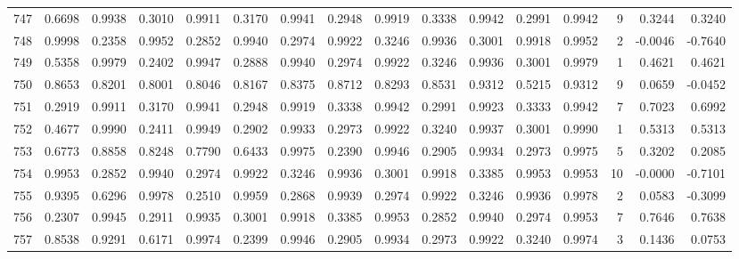 \begin{tabular}{lrrrrrrrrrrrrrrr}
747 &      0.6698 &  0.9938 &  0.3010 &  0.9911 &  0.3170 &  0.9941 &  0.2948 &  0.9919 &  0.3338 &  0.9942 &   0.2991 &     0.9942 &      9 &                    0.3244 &                     0.3240 \\
748 &      0.9998 &  0.2358 &  0.9952 &  0.2852 &  0.9940 &  0.2974 &  0.9922 &  0.3246 &  0.9936 &  0.3001 &   0.9918 &     0.9952 &      2 &                   -0.0046 &                    -0.7640 \\
749 &      0.5358 &  0.9979 &  0.2402 &  0.9947 &  0.2888 &  0.9940 &  0.2974 &  0.9922 &  0.3246 &  0.9936 &   0.3001 &     0.9979 &      1 &                    0.4621 &                     0.4621 \\
750 &      0.8653 &  0.8201 &  0.8001 &  0.8046 &  0.8167 &  0.8375 &  0.8712 &  0.8293 &  0.8531 &  0.9312 &   0.5215 &     0.9312 &      9 &                    0.0659 &                    -0.0452 \\
751 &      0.2919 &  0.9911 &  0.3170 &  0.9941 &  0.2948 &  0.9919 &  0.3338 &  0.9942 &  0.2991 &  0.9923 &   0.3333 &     0.9942 &      7 &                    0.7023 &                     0.6992 \\
752 &      0.4677 &  0.9990 &  0.2411 &  0.9949 &  0.2902 &  0.9933 &  0.2973 &  0.9922 &  0.3240 &  0.9937 &   0.3001 &     0.9990 &      1 &                    0.5313 &                     0.5313 \\
753 &      0.6773 &  0.8858 &  0.8248 &  0.7790 &  0.6433 &  0.9975 &  0.2390 &  0.9946 &  0.2905 &  0.9934 &   0.2973 &     0.9975 &      5 &                    0.3202 &                     0.2085 \\
754 &      0.9953 &  0.2852 &  0.9940 &  0.2974 &  0.9922 &  0.3246 &  0.9936 &  0.3001 &  0.9918 &  0.3385 &   0.9953 &     0.9953 &     10 &                   -0.0000 &                    -0.7101 \\
755 &      0.9395 &  0.6296 &  0.9978 &  0.2510 &  0.9959 &  0.2868 &  0.9939 &  0.2974 &  0.9922 &  0.3246 &   0.9936 &     0.9978 &      2 &                    0.0583 &                    -0.3099 \\
756 &      0.2307 &  0.9945 &  0.2911 &  0.9935 &  0.3001 &  0.9918 &  0.3385 &  0.9953 &  0.2852 &  0.9940 &   0.2974 &     0.9953 &      7 &                    0.7646 &                     0.7638 \\
757 &      0.8538 &  0.9291 &  0.6171 &  0.9974 &  0.2399 &  0.9946 &  0.2905 &  0.9934 &  0.2973 &  0.9922 &   0.3240 &     0.9974 &      3 &                    0.1436 &                     0.0753 \\

\end{tabular}
